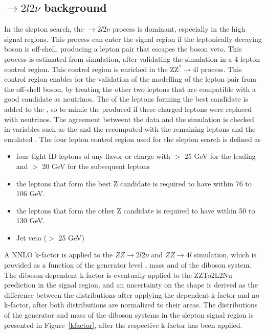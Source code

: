 \subsection*{\PZZ$\rightarrow2l2\nu$ background}
\noindent
\justify
In the slepton search, the \PZZ$\rightarrow2l2\nu$ process is dominant, especially in the high \ptmiss signal regions.
This process can enter the signal region if the leptonically decaying \PZ boson is off-shell, producing a lepton pair that escapes the \PZ boson veto.
This process is estimated from simulation, after validating the simulation in a 4 lepton control region.  
This control region is enriched in the Z$\mathrm{Z^{*}}\rightarrow$4l process.
This control region enables for the validation of the modelling of the lepton pair from the off-shell \PZ boson, by treating the other two leptons that are compatible with a good \PZ candidate as neutrinos. 
The \pt of the leptons forming the best \PZ candidate is added to the \ptmiss, so to mimic the \ptmiss produced if these charged leptons were replaced with neutrinos.
The agreement betweent the data and the simulation is checked in variables such as the \ptmiss and the \mttwo recomputed with the remaining leptons and the emulated \ptmiss.
The four lepton control region used for the slepton search is defined as
\begin{itemize} 
    \item four tight ID leptons of any flavor or charge with \pt $>$ 25 GeV for the leading and \pt $>$ 20 GeV for the subsequent leptons
    \item the leptons that form the best Z candidate is required to have \mll within 76 to 106 GeV. 
    \item the leptons that form the other Z candidate is required to have \mll within 50 to 130 GeV.
    \item Jet veto (\pt $>$ 25 GeV) 
\end{itemize}                       
A NNLO k-factor is applied to the $ZZ\rightarrow 2l2\nu$ and $ZZ\rightarrow 4l$ simulation, which is provided as a function of the generator level \pt, mass and \dphi of the diboson system.
The diboson \pt dependent k-factor is eventually applied to the ZZTo2L2Nu prediction in the signal region, and an uncertainty on the shape is derived as the difference between the distributions after     applying the \pt dependent k-factor and no k-factor, after both distributions are normalized to their areas.
The distributions of the generator \pt and mass of the diboson systems in the slepton signal region is presented in Figure~\ref{kfactor}, after the respective k-factor has been applied.
